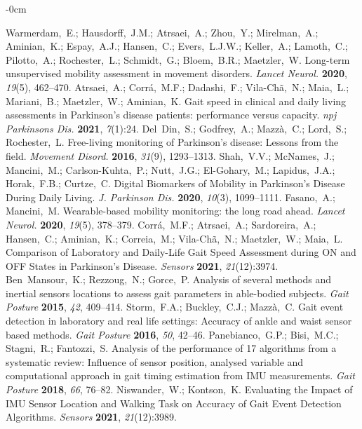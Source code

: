 \documentclass[sensors,article,submit,pdftex,moreauthors]{Definitions/mdpi}
\begin{document}
\begin{adjustwidth}{-\extralength}{0cm}
\begin{thebibliography}{999}
	Warmerdam,~E.; Hausdorff,~J.M.; Atrsaei,~A.; Zhou,~Y.; Mirelman,~A.; Aminian,~K.; Espay,~A.J.; Hansen,~C.; Evers,~L.J.W.; Keller,~A.; Lamoth,~C.; Pilotto,~A.; Rochester,~L.; Schmidt,~G.; Bloem,~B.R.; Maetzler,~W. Long-term unsupervised mobility assessment in movement disorders. {\em Lancet Neurol.} {\bf 2020}, {\em 19}(5), 462--470.
	Atrsaei,~A.; Corr\'{a},~M.F.; Dadashi,~F.; Vila-Ch\~{a},~N.; Maia,~L.; Mariani,~B.; Maetzler,~W.; Aminian,~K. Gait speed in clinical and daily living assessments in Parkinson’s disease patients: performance versus capacity. {\em npj Parkinsons Dis.} {\bf 2021}, {\em 7}(1):24.
	Del~Din,~S.; Godfrey,~A.; Mazz\`{a},~C.; Lord,~S.; Rochester,~L. Free-living monitoring of Parkinson's disease: Lessons from the field. {\em Movement Disord.} {\bf 2016}, {\em 31}(9), 1293--1313.
	Shah,~V.V.; McNames,~J.; Mancini,~M.; Carlson-Kuhta,~P.; Nutt,~J.G.; El-Gohary,~M.; Lapidus,~J.A.; Horak,~F.B.; Curtze,~C. Digital Biomarkers of Mobility in Parkinson's Disease During Daily Living. {\em J. Parkinson Dis.} {\bf 2020}, {\em 10}(3), 1099--1111.
	Fasano,~A.; Mancini,~M. Wearable-based mobility monitoring: the long road ahead. {\em Lancet Neurol.} {\bf 2020}, {\em 19}(5), 378--379.
	Corr\'{a},~M.F.; Atrsaei,~A.; Sardoreira,~A.; Hansen,~C.; Aminian,~K.; Correia,~M.; Vila-Ch\~{a},~N.; Maetzler,~W.; Maia,~L. Comparison of Laboratory and Daily-Life Gait Speed Assessment during ON and OFF States in Parkinson’s Disease. {\em Sensors} {\bf 2021}, {\em 21}(12):3974.
	Ben~Mansour,~K.; Rezzoug,~N.; Gorce,~P. Analysis of several methods and inertial sensors locations to assess gait parameters in able-bodied subjects. {\em Gait Posture} {\bf 2015}, {\em 42}, 409--414.
	Storm,~F.A.; Buckley,~C.J.; Mazz\`{a},~C. Gait event detection in laboratory and real life settings: Accuracy of ankle and waist sensor based methods. {\em Gait Posture} {\bf 2016}, {\em 50}, 42--46.
	Panebianco,~G.P.; Bisi,~M.C.; Stagni,~R.; Fantozzi,~S. Analysis of the performance of 17 algorithms from a systematic review: Influence of sensor position, analysed variable and computational approach in gait timing estimation from IMU measurements. {\em Gait Posture} {\bf 2018}, {\em 66}, 76--82.
	Niswander,~W.; Kontson,~K. Evaluating the Impact of IMU Sensor Location and Walking Task on Accuracy of Gait Event Detection Algorithms. {\em Sensors} {\bf 2021}, {\em 21}(12):3989.

\end{thebibliography}
\end{adjustwidth}
\end{document}
